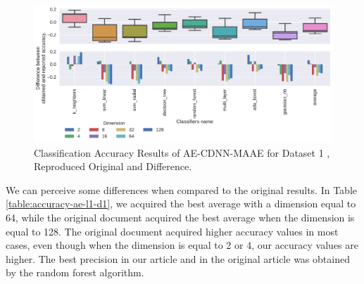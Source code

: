 \begin{figure}[!ht]
  \centering
  \includegraphics[width=0.8\linewidth]{figure/table_3.pdf}
  \caption{Classification Accuracy Results of AE-CDNN-MAAE for Dataset 1 \cite{WenZha:2018}, Reproduced Original and Difference.}
\label{fig:acc-AE-CDNN-MAAE-d1}
\end{figure}

We can perceive some differences when compared to the original results. In Table \ref{table:accuracy-ae-l1-d1}, we acquired the best average with a dimension equal to 64, while the original document acquired the best average when the dimension is equal to 128. The original document acquired higher accuracy values in most cases, even though when the dimension is equal to 2 or 4, our accuracy values are higher. The best precision in our article and in the original article was obtained by the random forest algorithm.


\begin{table}[!ht]
\centering
{}
\caption{Accuracy values obtained in reproduction, AE-CDNN-MAE for Dataset 2.}
\label{table:accuracy-ae-l1-d2}
\end{table}

